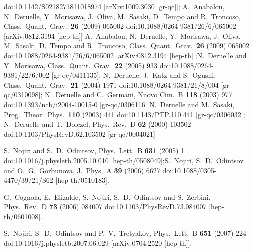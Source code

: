\documentclass[a4paper,aps,onecolumn,nofootinbib]{revtex4}
\begin{document}
\begin{thebibliography}{999}
  doi:10.1142/S0218271811018974
  [arXiv:1009.3030 [gr-qc]]; 
  A.~Anabalon, N.~Deruelle, Y.~Morisawa, J.~Oliva, M.~Sasaki, D.~Tempo and R.~Troncoso,
  Class.\ Quant.\ Grav.\  {\bf 26} (2009) 065002
  doi:10.1088/0264-9381/26/6/065002
  [arXiv:0812.3194 [hep-th]]
  A.~Anabalon, N.~Deruelle, Y.~Morisawa, J.~Oliva, M.~Sasaki, D.~Tempo and R.~Troncoso,
  Class.\ Quant.\ Grav.\  {\bf 26} (2009) 065002
  doi:10.1088/0264-9381/26/6/065002
  [arXiv:0812.3194 [hep-th]];N.~Deruelle and Y.~Morisawa,
  Class.\ Quant.\ Grav.\  {\bf 22} (2005) 933
  doi:10.1088/0264-9381/22/6/002
  [gr-qc/0411135];
  N.~Deruelle, J.~Katz and S.~Ogushi,
  Class.\ Quant.\ Grav.\  {\bf 21} (2004) 1971
  doi:10.1088/0264-9381/21/8/004
  [gr-qc/0310098];
  N.~Deruelle and C.~Germani,
  Nuovo Cim.\ B {\bf 118} (2003) 977
  doi:10.1393/ncb/i2004-10015-0
  [gr-qc/0306116]
  N.~Deruelle and M.~Sasaki,
  Prog.\ Theor.\ Phys.\  {\bf 110} (2003) 441
  doi:10.1143/PTP.110.441
  [gr-qc/0306032];
  N.~Deruelle and T.~Dolezel,
  Phys.\ Rev.\ D {\bf 62} (2000) 103502
  doi:10.1103/PhysRevD.62.103502
  [gr-qc/0004021]
  
   S.~Nojiri and S.~D.~Odintsov,
  Phys.\ Lett.\ B {\bf 631} (2005) 1
  doi:10.1016/j.physletb.2005.10.010
  [hep-th/0508049];S.~Nojiri, S.~D.~Odintsov and O.~G.~Gorbunova,
  J.\ Phys.\ A {\bf 39} (2006) 6627
  doi:10.1088/0305-4470/39/21/S62
  [hep-th/0510183].
  
  G.~Cognola, E.~Elizalde, S.~Nojiri, S.~D.~Odintsov and S.~Zerbini,
  Phys.\ Rev.\ D {\bf 73} (2006) 084007
  doi:10.1103/PhysRevD.73.084007
  [hep-th/0601008].
  
  S.~Nojiri, S.~D.~Odintsov and P.~V.~Tretyakov,
  Phys.\ Lett.\ B {\bf 651} (2007) 224
  doi:10.1016/j.physletb.2007.06.029
  [arXiv:0704.2520 [hep-th]].
  

\end{thebibliography}
\end{document}
